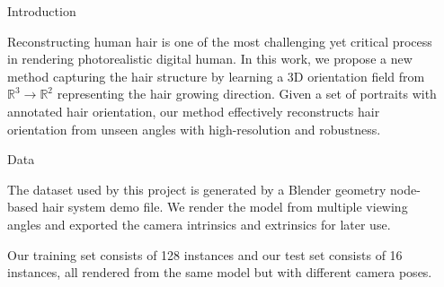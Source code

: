 \documentclass[final]{beamer}
\newlength{\sepwidth}
\newlength{\colwidth}
\newcommand{\separatorcolumn}{\begin{column}{\sepwidth}\end{column}}
\begin{document}
\begin{frame}[t]

\begin{columns}[t]

\separatorcolumn

\begin{column}{\colwidth}

  \begin{block}{Introduction}

    Reconstructing human hair is one of the most challenging yet critical process in rendering photorealistic digital human. In this work, we propose a new method capturing the hair structure by learning a 3D orientation field from $\mathbb{R}^{3} \rightarrow \mathbb{R}^{2}$ representing the hair growing direction. Given a set of portraits with annotated hair orientation, our method effectively reconstructs hair orientation from unseen angles with high-resolution and robustness.

  \end{block}

  \begin{block}{Data}
  
  The dataset used by this project is generated by a Blender geometry node-based hair system demo file. We render the model from multiple viewing angles and exported the camera intrinsics and extrinsics for later use.

    Our training set consists of 128 instances and our test set consists of 16 instances, all rendered from the same model but with different camera poses.


\end{block}
\end{column}
\end{columns}
\end{frame}
\end{document}
